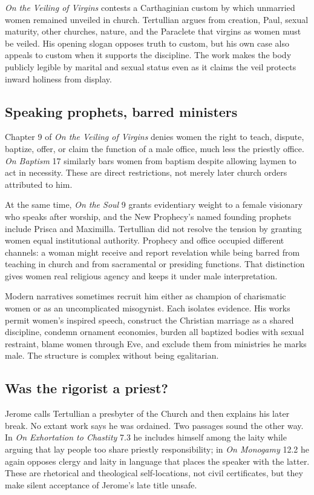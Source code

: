 \emph{On the Veiling of Virgins} contests a Carthaginian custom by which
unmarried women remained unveiled in church. Tertullian argues from creation,
Paul, sexual maturity, other churches, nature, and the Paraclete that virgins as
women must be veiled. His opening slogan opposes truth to custom, but his own
case also appeals to custom when it supports the discipline. The work makes the
body publicly legible by marital and sexual status even as it claims the veil
protects inward holiness from display.

\subsection{Speaking prophets, barred ministers}

Chapter 9 of \emph{On the Veiling of Virgins} denies women the right to teach,
dispute, baptize, offer, or claim the function of a male office, much less the
priestly office. \emph{On Baptism} 17 similarly bars women from baptism despite
allowing laymen to act in necessity. These are direct restrictions, not merely
later church orders attributed to him.

At the same time, \emph{On the Soul} 9 grants evidentiary weight to a female
visionary who speaks after worship, and the New Prophecy's named founding
prophets include Prisca and Maximilla. Tertullian did not resolve the tension by
granting women equal institutional authority. Prophecy and office occupied
different channels: a woman might receive and report revelation while being
barred from teaching in church and from sacramental or presiding functions.
That distinction gives women real religious agency and keeps it under male
interpretation.

Modern narratives sometimes recruit him either as champion of charismatic
women or as an uncomplicated misogynist. Each isolates evidence. His works
permit women's inspired speech, construct the Christian marriage as a shared
discipline, condemn ornament economies, burden all baptized bodies with sexual
restraint, blame women through Eve, and exclude them from ministries he marks
male. The structure is complex without being egalitarian.

\subsection{Was the rigorist a priest?}

Jerome calls Tertullian a presbyter of the Church and then explains his later
break. No extant work says he was ordained. Two passages sound the other way.
In \emph{On Exhortation to Chastity} 7.3 he includes himself among the laity
while arguing that lay people too share priestly responsibility; in \emph{On
Monogamy} 12.2 he again opposes clergy and laity in language that places the
speaker with the latter. These are rhetorical and theological
self-locations, not civil certificates, but they make silent acceptance of
Jerome's late title unsafe.

